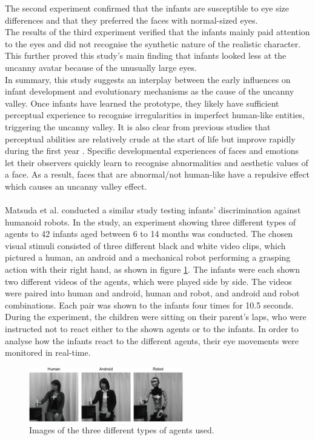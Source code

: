 The second experiment confirmed that the infants are susceptible to eye size differences and that they preferred the faces with normal-sized eyes.\\
The results of the third experiment verified that the infants mainly paid attention to the eyes and did not recognise the synthetic nature of the realistic character. This further proved this study's main finding that infants looked less at the uncanny avatar because of the unusually large eyes.\\
In summary, this study suggests an interplay between the early influences on infant development and evolutionary mechanisms as the cause of the uncanny valley. Once infants have learned the prototype, they likely have sufficient perceptual experience to recognise irregularities in imperfect human-like entities, triggering the uncanny valley. It is also clear from previous studies that perceptual abilities are relatively crude at the start of life but improve rapidly during the first year \cite{Lewkowicz2009_perceptual_abilities,Pascalis2009_perceptual_abilities}. Specific developmental experiences of faces and emotions let their observers quickly learn to recognise abnormalities and aesthetic values of a face. As a result, faces that are abnormal/not human-like have a repulsive effect which causes an uncanny valley effect.\\\\
Matsuda et al. \cite{uncanny_infant_discrimination} conducted a similar study testing infants' discrimination against humanoid robots. In the study, an experiment showing three different types of agents to 42 infants aged between 6 to 14 months was conducted. The chosen visual stimuli consisted of three different black and white video clips, which pictured a human, an android and a mechanical robot performing a grasping action with their right hand, as shown in figure \ref{fig:uncannyInfantsDiscrimination}. The infants were each shown two different videos of the agents, which were played side by side. 
\newpage
The videos were paired into human and android, human and robot, and android and robot combinations. Each pair was shown to the infants four times for 10.5 seconds. During the experiment, the children were sitting on their parent's laps, who were instructed not to react either to the shown agents or to the infants. In order to analyse how the infants react to the different agents, their eye movements were monitored in real-time.
\begin{figure} %
    \centering
    \includegraphics[width=0.6\textwidth]{graphics/uncanny_infants_discrimination.png}
    \caption{Images of the three different types of agents used.}
    \label{fig:uncannyInfantsDiscrimination}
\end{figure}
